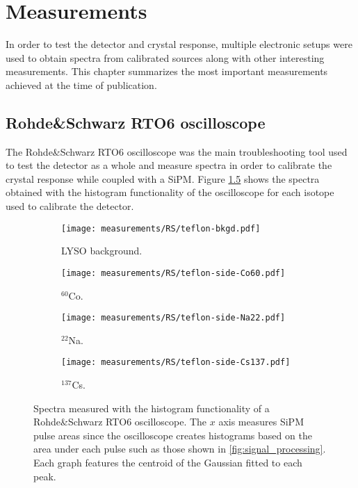 \chapter{Measurements}\label{chap:measurements}

In order to test the detector and crystal response, multiple electronic setups were used to obtain spectra from calibrated sources along with other interesting measurements. This chapter summarizes the most important measurements achieved at the time of publication.

\section{Rohde\&Schwarz RTO6 oscilloscope}

The Rohde\&Schwarz RTO6 oscilloscope was the main troubleshooting tool used to test the detector as a whole and measure spectra in order to calibrate the crystal response while coupled with a SiPM. Figure \ref{fig:RS_spectra} shows the spectra obtained with the histogram functionality of the oscilloscope for each isotope used to calibrate the detector. 

\begin{figure}
    \begin{subfigure}[t]{0.48\textwidth}
      \centering
      \texttt{[image: measurements/RS/teflon-bkgd.pdf]}
      \caption{\label{sfig:RS_bkgd}LYSO background.}
    \end{subfigure}
    \hfill
    \begin{subfigure}[t]{0.48\textwidth}
      \centering
      \texttt{[image: measurements/RS/teflon-side-Co60.pdf]}
      \caption{\label{sfig:RS_60Co}$^{60}$Co.}
    \end{subfigure}
    \medskip
    \begin{subfigure}[t]{0.48\textwidth}
      \centering
      \texttt{[image: measurements/RS/teflon-side-Na22.pdf]}
      \caption{\label{sfig:RS_22Na}$^{22}$Na.}
    \end{subfigure}
    \hfill
    \begin{subfigure}[t]{0.48\textwidth}
      \centering
      \texttt{[image: measurements/RS/teflon-side-Cs137.pdf]}
      \caption{\label{sfig:RS_137Cs}$^{137}$Cs.}
    \end{subfigure}
    \caption{\label{fig:RS_spectra}Spectra measured with the histogram functionality of a Rohde\&Schwarz RTO6 oscilloscope. The $x$ axis measures SiPM pulse areas since the oscilloscope creates histograms based on the area under each pulse such as those shown in \ref{fig:signal_processing}. Each graph features the centroid of the Gaussian fitted to each peak.}
  \end{figure}

